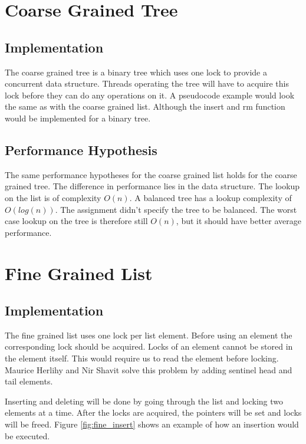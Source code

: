 \documentclass[10pt,a4paper]{article}
\begin{document}
\section{Coarse Grained Tree} \subsection{Implementation} The coarse grained
tree is a binary tree which uses one lock to provide a concurrent data
structure. Threads operating the tree will have to acquire this lock before
they can do any operations on it. A pseudocode example would look the same as
with the coarse grained list. Although the insert and rm function would be
implemented for a binary tree.

\subsection{Performance Hypothesis} The same performance hypotheses for the
coarse grained list holds for the coarse grained tree. The difference in
performance lies in the data structure. The lookup on the list is of complexity
$O(n)$. A balanced tree has a lookup complexity of $O(log(n))$. The assignment
didn't specify the tree to be balanced. The worst case lookup on the tree is
therefore still $O(n)$, but it should have better average performance.

\section{Fine Grained List} \subsection{Implementation} The fine grained list
uses one lock per list element. Before using an element the corresponding lock
should be acquired. Locks of an element cannot be stored in the element
itself. This would require us to read the element before locking. Maurice
Herlihy and Nir Shavit solve this problem by adding sentinel head and tail
elements.

Inserting and deleting will be done by going through the list and locking two
elements at a time. After the locks are acquired, the pointers will be set and
locks will be freed. Figure \ref{fig:fine_insert} shows an example of how an insertion
would be executed.
\end{document}
